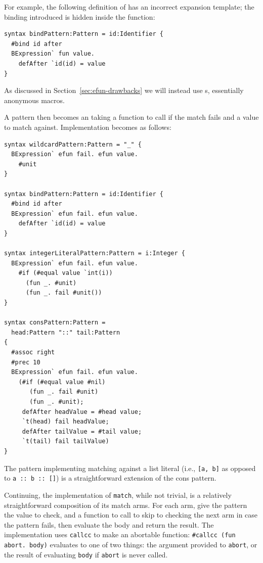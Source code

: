 \documentclass{kththesis}
\begin{document}
For example, the following definition of  has an incorrect expansion template; the binding introduced is hidden inside the function:

\begin{verbatim}
syntax bindPattern:Pattern = id:Identifier {
  #bind id after
  BExpression` fun value.
    defAfter `id(id) = value
}
\end{verbatim}

As discussed in Section~\ref{sec:efun-drawbacks} we will instead use s, essentially anonymous macros.

A pattern then becomes an  taking a function to call if the match fails and a value to match against. Implementation becomes as follows:

\begin{verbatim}
syntax wildcardPattern:Pattern = "_" {
  BExpression` efun fail. efun value.
    #unit
}

syntax bindPattern:Pattern = id:Identifier {
  #bind id after
  BExpression` efun fail. efun value.
    defAfter `id(id) = value
}

syntax integerLiteralPattern:Pattern = i:Integer {
  BExpression` efun fail. efun value.
    #if (#equal value `int(i))
      (fun _. #unit)
      (fun _. fail #unit())
}

syntax consPattern:Pattern =
  head:Pattern "::" tail:Pattern
{
  #assoc right
  #prec 10
  BExpression` efun fail. efun value.
    (#if (#equal value #nil)
       (fun _. fail #unit)
       (fun _. #unit);
     defAfter headValue = #head value;
     `t(head) fail headValue;
     defAfter tailValue = #tail value;
     `t(tail) fail tailValue)
}
\end{verbatim}

The pattern implementing matching against a list literal (i.e., \texttt{[a, b]} as opposed to \texttt{a :: b :: []}) is a straightforward extension of the cons pattern.

Continuing, the implementation of \texttt{match}, while not trivial, is a relatively straightforward composition of its match arms. For each arm, give the pattern the value to check, and a function to call to skip to checking the next arm in case the pattern fails, then evaluate the body and return the result. The implementation uses \texttt{callcc} to make an abortable function: \texttt{#callcc (fun abort. body)} evaluates to one of two things: the argument provided to \texttt{abort}, or the result of evaluating \texttt{body} if \texttt{abort} is never called.
\end{document}

